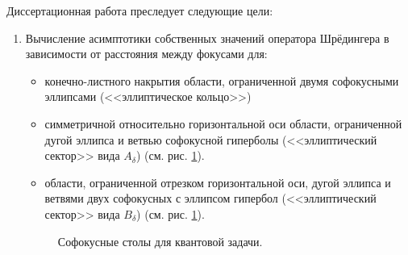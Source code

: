 {\aim} 
Диссертационная работа преследует следующие цели:
\begin{enumerate}[beginpenalty=10000] %
  \item Вычисление асимптотики собственных значений оператора Шрёдингера в зависимости от расстояния между фокусами для:
  \begin{itemize}[beginpenalty=10000] %
  \item конечно-листного накрытия области, ограниченной двумя софокусными эллипсами (<<эллиптическое кольцо>>)
  \item симметричной относительно горизонтальной оси области, ограниченной дугой эллипса и ветвью софокусной  гиперболы (<<эллиптический сектор>> вида $A_\delta$)  (см. рис. \ref{fig:intro_quantum_domains}).
  \item области, ограниченной отрезком горизонтальной оси, дугой эллипса и ветвями двух софокусных с эллипсом гипербол (<<эллиптический сектор>> вида $B_\delta$)  (см. рис. \ref{fig:intro_quantum_domains}).
  \end{itemize}
   \begin{figure}[ht]
    \caption{Софокусные столы для квантовой задачи.}\label{fig:intro_quantum_domains}
\end{figure}
  

\end{enumerate}
